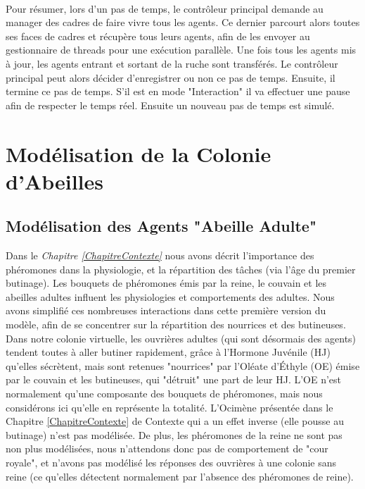 			\paragraph{}			
			Pour résumer, lors d'un pas de temps, le contrôleur principal demande au manager des cadres de faire vivre tous les agents. Ce dernier parcourt alors toutes ses faces de cadres et récupère tous leurs agents, afin de les envoyer au gestionnaire de threads pour une exécution parallèle. Une fois tous les agents mis à jour, les agents entrant et sortant de la ruche sont transférés. Le contrôleur principal peut alors décider d'enregistrer ou non ce pas de temps. Ensuite, il termine ce pas de temps. S'il est en mode "Interaction" il va effectuer une pause afin de respecter le temps réel. Ensuite un nouveau pas de temps est simulé.
			
	\section{Modélisation de la Colonie d'Abeilles}
	\label{sectionModelColonie}
		\subsection{Modélisation des Agents "Abeille Adulte"}
		
		Dans le \textit{Chapitre \ref{ChapitreContexte}} nous avons décrit l'importance des phéromones dans la physiologie, et la répartition des tâches (via l'âge du premier butinage). Les bouquets de phéromones émis par la reine, le couvain et les abeilles adultes influent les physiologies et comportements des adultes. Nous avons simplifié ces nombreuses interactions dans cette première version du modèle, afin de se concentrer sur la répartition des nourrices et des butineuses. Dans notre colonie virtuelle, les ouvrières adultes (qui sont désormais des agents) tendent toutes à aller butiner rapidement, grâce à l'Hormone Juvénile (HJ) qu'elles sécrètent, mais sont retenues "nourrices" par l'Oléate d'Éthyle (OE) émise par le couvain et les butineuses, qui "détruit" une part de leur HJ. L'OE n'est normalement qu'une composante des bouquets de phéromones, mais nous considérons ici qu'elle en représente la totalité. L'Ocimène présentée dans le Chapitre  \ref{ChapitreContexte} de Contexte qui a un effet inverse (elle pousse au butinage) n'est pas modélisée. De plus, les phéromones de la reine ne sont pas non plus modélisées, nous n'attendons donc pas de comportement de "cour royale", et n'avons pas modélisé les réponses des ouvrières à une colonie sans reine (ce qu'elles détectent normalement par l'absence des phéromones de reine).
		
